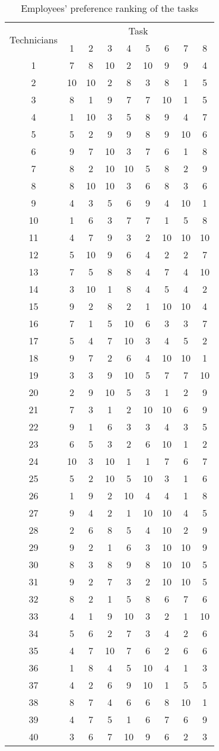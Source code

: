 \begin{enumerate}[(a)]
\begin{table}[H]
	\centering
	\caption{Employees' preference ranking of the tasks}
	\begin{tabular}{c|*{8}c}\hline
	\multirow{2}{*}{Technicians} & \multicolumn{8}{|c}{Task} \\ \cline{2-9}
	& 1&2&3&4&5&6&7&8\\ \hline
1&7&8&10&2&10&9&9&4 \\ 
2&10&10&2&8&3&8&1&5 \\ 
3&8&1&9&7&7&10&1&5 \\ 
4&1&10&3&5&8&9&4&7 \\ 
5&5&2&9&9&8&9&10&6 \\ 
6&9&7&10&3&7&6&1&8 \\ 
7&8&2&10&10&5&8&2&9 \\ 
8&8&10&10&3&6&8&3&6 \\ 
9&4&3&5&6&9&4&10&1 \\ 
10&1&6&3&7&7&1&5&8 \\ 
11&4&7&9&3&2&10&10&10 \\ 
12&5&10&9&6&4&2&2&7 \\ 
13&7&5&8&8&4&7&4&10 \\ 
14&3&10&1&8&4&5&4&2 \\ 
15&9&2&8&2&1&10&10&4 \\ 
16&7&1&5&10&6&3&3&7 \\ 
17&5&4&7&10&3&4&5&2 \\ 
18&9&7&2&6&4&10&10&1 \\ 
19&3&3&9&10&5&7&7&10 \\ 
20&2&9&10&5&3&1&2&9 \\ 
21&7&3&1&2&10&10&6&9 \\ 
22&9&1&6&3&3&4&3&5 \\ 
23&6&5&3&2&6&10&1&2 \\ 
24&10&3&10&1&1&7&6&7 \\ 
25&5&2&10&5&10&3&1&6 \\ 
26&1&9&2&10&4&4&1&8 \\ 
27&9&4&2&1&10&10&4&5 \\ 
28&2&6&8&5&4&10&2&9 \\ 
29&9&2&1&6&3&10&10&9 \\ 
30&8&3&8&9&8&10&10&5 \\ 
31&9&2&7&3&2&10&10&5 \\ 
32&8&2&1&5&8&6&7&6 \\ 
33&4&1&9&10&3&2&1&10 \\ 
34&5&6&2&7&3&4&2&6 \\ 
35&4&7&10&7&6&2&6&6 \\ 
36&1&8&4&5&10&4&1&3 \\ 
37&4&2&6&9&10&1&5&5 \\ 
38&8&7&4&6&6&8&10&1 \\ 
39&4&7&5&1&6&7&6&9 \\ 
40&3&6&7&10&9&6&2&3 \\ 
\hline
	\end{tabular}
	\label{task-cost}
\end{table}


\end{enumerate}
